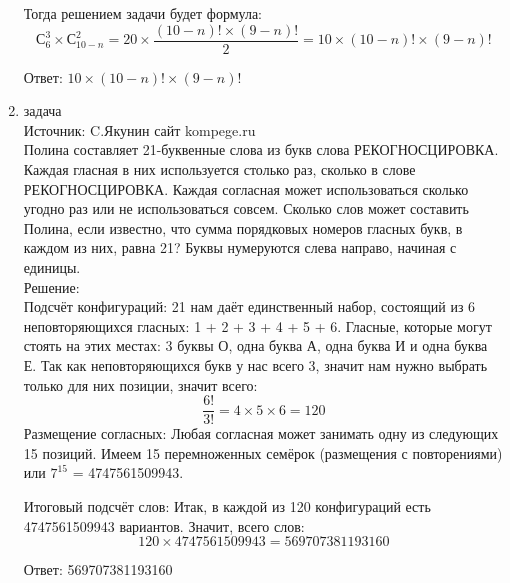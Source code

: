 \documentclass[a4paper,14pt]{extreport} %
\begin{document}
\begin{center}
\begin{enumerate}
						Тогда решением задачи будет формула:
								\begin{equation}
									С_6^3 \times С_{10-n}^2 = 20 \times \frac{(10-n)!\times(9-n)!}{2} = 10 \times {(10-n)!\times(9-n)!}
								\end{equation}
								
						Ответ: $10 \times {(10-n)!\times(9-n)!}$
						
						 \item {\large задача  }\\
						Источник: C.Якунин сайт kompege.ru\\
						\vspace{15pt}
						Полина составляет 21-буквенные слова из букв слова РЕКОГНОСЦИРОВКА. Каждая гласная в них используется столько раз, сколько в слове \\РЕКОГНОСЦИРОВКА. Каждая согласная может использоваться сколько угодно раз или не использоваться совсем. Сколько слов может составить Полина, если известно, что сумма порядковых номеров гласных букв, в каждом из них, равна 21? Буквы нумеруются слева направо, начиная с единицы.\\
						\vspace{15pt}
						Решение:\\
						Подсчёт конфигураций:
						21 нам даёт единственный набор, состоящий из 6 неповторяющихся гласных: 1 + 2 + 3 + 4 + 5 + 6. Гласные, которые могут стоять на этих местах: 3 буквы О, одна буква А, одна буква И и одна буква Е.  Так как неповторяющихся букв у нас всего 3, значит нам нужно выбрать только для них позиции, значит всего:
						\begin{equation}
						 \frac{6!}{3!} = 4 \times5 \times6 = 120 
						\end{equation}
						Размещение согласных:				
						Любая согласная может занимать одну из следующих 15 позиций. Имеем 15 перемноженных семёрок (размещения с повторениями) или $7^{15}$ = 4747561509943.
						
						\newpage						
						
						Итоговый подсчёт слов:
						Итак, в каждой из 120 конфигураций есть 4747561509943 вариантов. Значит, всего слов: 
						\begin{equation}
							120 \times 4747561509943 = 569707381193160 
						\end{equation}
						
						Ответ: 569707381193160
						
						
						
						
						

\end{enumerate}
\end{center}
\end{document}
